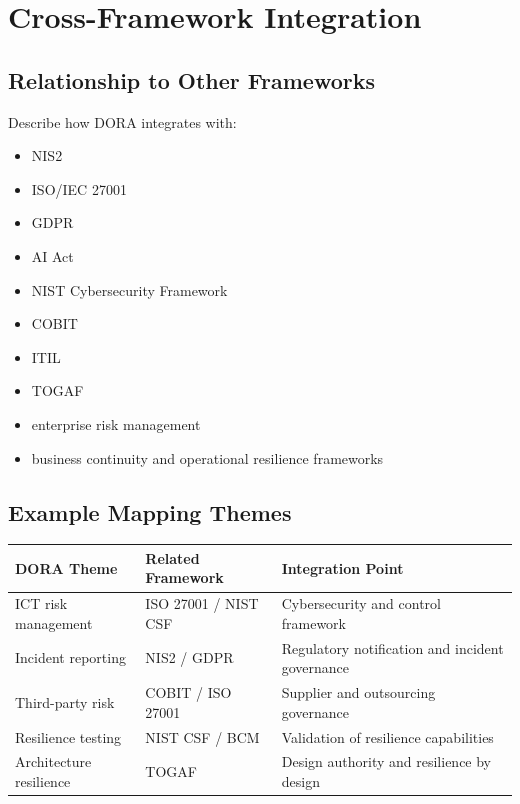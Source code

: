 \documentclass[
  letterpaper,
  DIV=11,
  numbers=noendperiod]{scrartcl}
\providecommand{\tightlist}{%
  \setlength{\itemsep}{0pt}\setlength{\parskip}{0pt}}
\begin{document}
\section{Cross-Framework Integration}\label{cross-framework-integration}

\subsection{Relationship to Other
Frameworks}\label{relationship-to-other-frameworks}

Describe how DORA integrates with:

\begin{itemize}
\tightlist
\item
  NIS2
\item
  ISO/IEC 27001
\item
  GDPR
\item
  AI Act
\item
  NIST Cybersecurity Framework
\item
  COBIT
\item
  ITIL
\item
  TOGAF
\item
  enterprise risk management
\item
  business continuity and operational resilience frameworks
\end{itemize}

\subsection{Example Mapping Themes}\label{example-mapping-themes}

\begin{longtable}[]{@{}
  >{\raggedright\arraybackslash}p{}
  >{\raggedright\arraybackslash}p{}
  >{\raggedright\arraybackslash}p{}@{}}
\toprule\noalign{}
\begin{minipage}[b]{\linewidth}\raggedright
DORA Theme
\end{minipage} & \begin{minipage}[b]{\linewidth}\raggedright
Related Framework
\end{minipage} & \begin{minipage}[b]{\linewidth}\raggedright
Integration Point
\end{minipage} \\
\midrule\noalign{}
\endhead
\bottomrule\noalign{}
\endlastfoot
ICT risk management & ISO 27001 / NIST CSF & Cybersecurity and control
framework \\
Incident reporting & NIS2 / GDPR & Regulatory notification and incident
governance \\
Third-party risk & COBIT / ISO 27001 & Supplier and outsourcing
governance \\
Resilience testing & NIST CSF / BCM & Validation of resilience
capabilities \\
Architecture resilience & TOGAF & Design authority and resilience by
design \\
\end{longtable}
\end{document}
